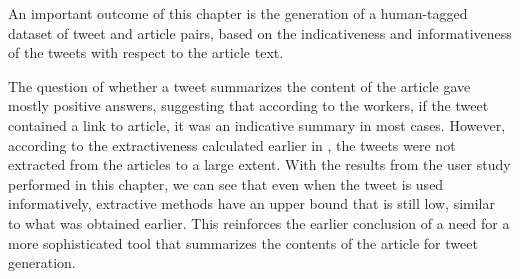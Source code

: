 An important outcome of this chapter is the generation of a human-tagged dataset of tweet and article pairs, based on the indicativeness and informativeness of the tweets with respect to the article text. 

The question of whether a tweet summarizes the content of the article gave mostly positive answers, suggesting that according to the workers, if the tweet contained a link to article, it was an indicative summary in most cases. However, according to the extractiveness calculated earlier in , the tweets were not extracted from the articles to a large extent. With the results from the user study performed in this chapter, we can see that even when the tweet is used informatively, extractive methods have an upper bound that is still low, similar to what was obtained earlier. This reinforces the earlier conclusion of a need for a more sophisticated tool that summarizes the contents of the article for tweet generation.



